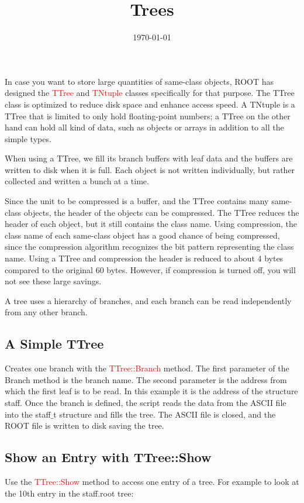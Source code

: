 \documentclass[12pt,a4paper]{article}
\title{Trees}
\author{}
\date{\today}
\begin{document}
\maketitle

In case you want to store large quantities of same-class objects, ROOT has designed the \textcolor{red}{TTree} and \textcolor{red}{TNtuple} classes specifically for that purpose. The TTree class is optimized to reduce disk space and enhance access speed. A TNtuple is a TTree that is limited to only hold floating-point numbers; a TTree on the other hand can hold all kind of data, such as objects or arrays in addition to all the simple types. 

When using a TTree, we fill its branch buffers with leaf data and the buffers are written to disk when it is full. Each object is not written individually, but rather collected and written a bunch at a time.

Since the unit to be compressed is a buffer, and the TTree contains many same-class objects, the header of the objects can be compressed. The TTree reduces the header of each object, but it still contains the class name. Using compression, the class name of each same-class object has a good chance of being compressed, since the compression algorithm recognizes the bit pattern representing the class name. Using a TTree and compression the header is reduced to about 4 bytes compared to the original 60 bytes. However, if compression is turned off, you will not see these large savings.

A tree uses a hierarchy of branches, and each branch can be read independently from any other branch.

\subsection{A Simple TTree}

Creates one branch with the \textcolor{red}{TTree::Branch} method. The first parameter of the Branch method is the branch name. The second parameter is the address from which the first leaf is to be read. In this example it is the address of the structure staff. Once the branch is defined, the script reads the data from the ASCII file into the staff$\_$t structure and fills the tree. The ASCII file is closed, and the ROOT file is written to disk saving the tree. 

\subsection{Show an Entry with TTree::Show}
Use the \textcolor{red}{TTree::Show} method to access one entry of a tree. For example to look at the 10th entry in the staff.root tree:
\end{document}
